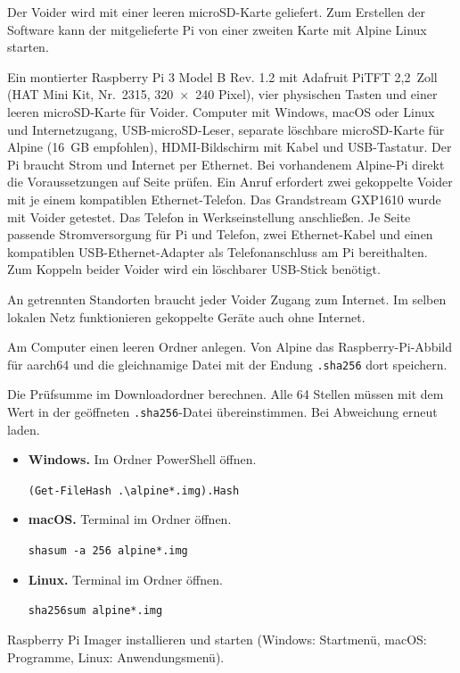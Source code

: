Der Voider wird mit einer leeren microSD-Karte geliefert. Zum Erstellen der Software kann der mitgelieferte Pi von einer zweiten Karte mit Alpine Linux starten.
\emergency
{}

Ein montierter Raspberry Pi 3 Model B Rev. 1.2 mit Adafruit PiTFT 2,2~Zoll (HAT Mini Kit, Nr.~2315, 320~×~240 Pixel), vier physischen Tasten und einer leeren microSD-Karte für Voider.
Computer mit Windows, macOS oder Linux und Internetzugang, USB-microSD-Leser, separate löschbare microSD-Karte für Alpine (16~GB empfohlen), HDMI-Bildschirm mit Kabel und USB-Tastatur. Der Pi braucht Strom und Internet per Ethernet. Bei vorhandenem Alpine-Pi direkt die Voraussetzungen auf Seite \pageref{de:alpine} prüfen.
Ein Anruf erfordert zwei gekoppelte Voider mit je einem kompatiblen Ethernet-Telefon. Das Grandstream GXP1610 wurde mit Voider getestet. Das Telefon in Werkseinstellung anschließen. Je Seite passende Stromversorgung für Pi und Telefon, zwei Ethernet-Kabel und einen kompatiblen USB-Ethernet-Adapter als Telefonanschluss am Pi bereithalten. Zum Koppeln beider Voider wird ein löschbarer USB-Stick benötigt.

An getrennten Standorten braucht jeder Voider Zugang zum Internet. Im selben lokalen Netz funktionieren gekoppelte Geräte auch ohne Internet.

Am Computer einen leeren Ordner anlegen. Von Alpine das Raspberry-Pi-Abbild für aarch64 und die gleichnamige Datei mit der Endung \texttt{.sha256} dort speichern.

\alpineSource

\alpineFile

Die Prüfsumme im Downloadordner berechnen. Alle 64 Stellen müssen mit dem Wert in der geöffneten \texttt{.sha256}-Datei übereinstimmen. Bei Abweichung erneut laden.
\begin{itemize}
\item \textbf{Windows.} Im Ordner PowerShell öffnen.\par
\verb|(Get-FileHash .\alpine*.img).Hash|
\item \textbf{macOS.} Terminal im Ordner öffnen.\par
\verb|shasum -a 256 alpine*.img|
\item \textbf{Linux.} Terminal im Ordner öffnen.\par
\verb|sha256sum alpine*.img|
\end{itemize}
Raspberry Pi Imager installieren und starten (Windows: Startmenü, macOS: Programme, Linux: Anwendungsmenü). \imagerSite

